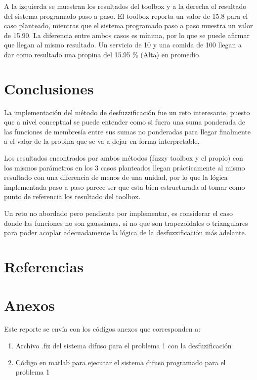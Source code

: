 \documentclass[11pt, letterpaper]{article}
\begin{document}
A la izquierda se muestran los resultados del toolbox y a la derecha el resultado del sistema programado paso a paso. El toolbox reporta un valor de 15.8 para el caso planteado, mientras que el sistema programado paso a paso muestra un valor de 15.90. La diferencia entre ambos casos es mínima, por lo que se puede afirmar que llegan al mismo resultado. Un servicio de 10 y una comida de 100 llegan a dar como resultado una propina del 15.95 \% (Alta) en promedio.


\newpage

\section{Conclusiones}

La implementación del método de desfuzzificación fue un reto interesante, puesto que a nivel conceptual se puede entender como si fuera una suma ponderada de las funciones de membresía entre sus sumas no ponderadas para llegar finalmente a el valor de la propina que se va a dejar en forma interpretable.

Los resultados encontrados por ambos métodos (fuzzy toolbox y el propio) con los mismos parámetros en los 3 casos planteados llegan prácticamente al mismo resultado con una diferencia de menos de una unidad, por lo que la lógica implementada paso a paso parece ser que esta bien estructurada al tomar como punto de referencia los resultado del toolbox.

Un reto no abordado pero pendiente por implementar, es considerar el caso donde las funciones no son gaussianas, si no que son trapezoidales o triangulares para poder acoplar adecuadamente la lógica de la desfuzzificación más adelante.





\newpage

\section{Referencias}


\newpage

\section{Anexos}

Este reporte se envía con los códigos anexos que corresponden a:

\begin{enumerate}
	\item Archivo .fiz del sistema difuso para el problema 1 con la desfuzificación 
	\item Código en matlab para ejecutar el sistema difuso programado para el problema 1

\end{enumerate}
\end{document}

